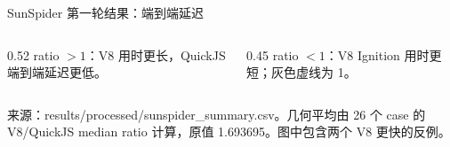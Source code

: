 \documentclass[aspectratio=169,10pt]{beamer}
\newcommand{\sourcenote}[1]{%
  {\color{NoteGray}\fontsize{6.7}{8}\selectfont #1}%
}
\begin{document}
\begin{frame}{SunSpider 第一轮结果：端到端延迟}
\vspace{-0.08cm}
{\fontsize{8.7}{10}\selectfont
\begin{columns}[T,onlytextwidth]
\begin{column}{0.52\textwidth}
\textcolor{DeepBlue}{ratio $>1$：}V8 用时更长，QuickJS 端到端延迟更低。
\end{column}
\begin{column}{0.45\textwidth}
\textcolor{DeepBlue}{ratio $<1$：}V8 Ignition 用时更短；灰色虚线为 1。
\end{column}
\end{columns}}

\vfill
\sourcenote{来源：results/processed/sunspider\_summary.csv。几何平均由 26 个 case 的 V8/QuickJS median ratio 计算，原值 1.693695。图中包含两个 V8 更快的反例。}
\end{frame}
\end{document}

